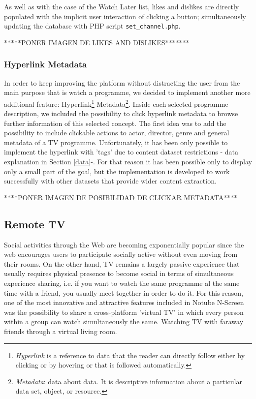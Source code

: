 \documentclass{acm_proc_article-sp}
\begin{document}
As well as with the case of the Watch Later list, likes and dislikes are directly populated with the implicit user interaction of clicking a button; simultaneously updating the database with PHP script \texttt{set\_channel.php}. 

*****PONER IMAGEN DE LIKES AND DISLIKES*******

\subsubsection{Hyperlink Metadata}

In order to keep improving the platform without distracting the user from the main purpose\cite{allen2012smashing} that is watch a programme, we decided to implement another more additional feature: Hyperlink\footnote{\textit{Hyperlink} is a reference to data that the reader can directly follow either by clicking or by hovering or that is followed automatically.} Metadata\footnote{\textit{Metadata}: data about data. It is descriptive information about a particular data set, object, or resource.}. Inside each selected programme description, we included the possibility to click hyperlink metadata to browse further information of this selected concept. The first idea was to add the possibility to include clickable actions to actor, director, genre and general metadata of a TV programme. Unfortunately, it has been only possible to implement the hyperlink with 'tags'  due to content dataset restrictions - data explanation in Section \ref{data}-. For that reason it has been possible only to display only a small part of the goal, but the implementation is developed to work successfully with other datasets that provide wider content extraction.

****PONER IMAGEN DE POSIBILIDAD DE CLICKAR METADATA****

\subsection{Remote TV}

Social activities through the Web are becoming exponentially popular since the web encourages users to  participate socially active without even moving from their rooms\cite{schopman2010notube}. On the other hand, TV remains a largely passive experience that usually requires physical presence to become social in terms of simultaneous experience sharing, i.e. if you want to watch the same programme al the same time with a friend, you usually meet together in order to do it. For this reason, one of the most innovative and attractive features included in Notube N-Screen was the possibility to share a cross-platform 'virtual TV' in which every person within a group can watch simultaneously the same. Watching TV with faraway friends through a virtual living room.
\end{document}
